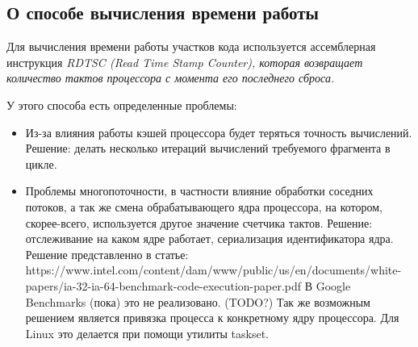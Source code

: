 \subsection{О способе вычисления времени работы}

Для вычисления времени работы участков кода используется ассемблерная инструкция \it{RDTSC} (Read Time Stamp Counter), которая возвращает количество тактов процессора с момента его последнего сброса.

У этого способа есть определенные проблемы:
\begin{itemize}
    \item Из-за влияния работы кэшей процессора будет теряться точность вычислений. Решение: делать несколько итераций вычислений требуемого фрагмента в цикле.
    \item Проблемы многопоточности, в частности влияние обработки соседних потоков, а так же смена обрабатывающего ядра процессора, на котором, скорее-всего, используется другое значение счетчика тактов. Решение: отслеживание на каком ядре работает, сериализация идентификатора ядра. Решение представленно в статье: https://www.intel.com/content/dam/www/public/us/en/documents/white-papers/ia-32-ia-64-benchmark-code-execution-paper.pdf В Google Benchmarks (пока) это не реализовано. (TODO?) Так же возможным решением является привязка процесса к конкретному ядру процессора. Для Linux это делается при помощи утилиты taskset.
\end{itemize}


